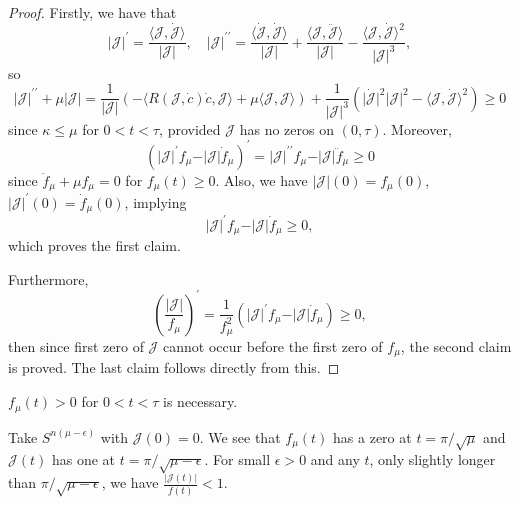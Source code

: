 \begin{proof}
	Firstly, we have that
	\[
		\vert \mathcal{J}  \vert ^{\prime} = \frac{\langle \mathcal{J} , \dot{\mathcal{J} }  \rangle }{\vert \mathcal{J}  \vert },\quad
		\vert \mathcal{J}  \vert ^{\prime\prime} = \frac{\langle \dot{\mathcal{J} } , \dot{\mathcal{J} } \rangle }{\vert \mathcal{J}  \vert } + \frac{\langle \mathcal{J} , \ddot{\mathcal{J} }  \rangle }{\vert \mathcal{J}  \vert } - \frac{\langle \mathcal{J} , \dot{\mathcal{J} }  \rangle ^2}{\vert \mathcal{J} \vert^3 },
	\]
	so
	\[
		\vert \mathcal{J}  \vert ^{\prime\prime} + \mu \vert \mathcal{J} \vert
		= \frac{1}{\vert \mathcal{J} \vert } \left( - \langle R(\mathcal{J} , \dot{c} ) \dot{c}, \mathcal{J} \rangle + \mu \langle \mathcal{J} , \mathcal{J}  \rangle  \right) + \frac{1}{\vert \mathcal{J}  \vert ^3} \left( \vert \dot{\mathcal{J} } \vert^2 \vert \mathcal{J}  \vert ^2 - \langle \mathcal{J} , \dot{\mathcal{J} } \rangle ^2 \right) \geq 0
	\]
	since \(\kappa \leq \mu \) for \(0 < t < \tau \), provided \(\mathcal{J} \) has no zeros on \((0, \tau )\). Moreover,
	\[
		\left( \vert \mathcal{J}  \vert ^{\prime} f_\mu - \vert \mathcal{J}  \vert \dot{f} _\mu  \right) ^{\prime}
		= \vert \mathcal{J}  \vert ^{\prime\prime} f_\mu - \vert \mathcal{J}  \vert \ddot{f}_\mu \geq 0
	\]
	since \(\ddot{f}_\mu + \mu f_\mu = 0\) for \(f_\mu (t) \geq 0\). Also, we have \(\vert \mathcal{J}  \vert (0) = f_\mu (0)\), \(\vert \mathcal{J}  \vert ^{\prime} (0) = \dot{f} _\mu (0)\), implying
	\[
		\vert \mathcal{J}  \vert ^{\prime} f_\mu - \vert \mathcal{J}  \vert \dot{f} _\mu \geq 0,
	\]
	which proves the first claim.

	Furthermore,
	\[
		\left( \frac{\vert \mathcal{J}  \vert }{f_\mu } \right) ^{\prime} = \frac{1}{f^2_\mu } \left( \vert \mathcal{J}  \vert ^{\prime} f_\mu - \vert \mathcal{J}  \vert \dot{f} _\mu  \right) \geq 0,
	\]
	then since first zero of \(\mathcal{J}\) cannot occur before the first zero of \(f_\mu \), the second claim is proved. The last claim follows directly from this.
\end{proof}

\begin{remark}
	\(f_\mu (t) > 0\) for \(0 < t < \tau \) is necessary.
\end{remark}
\begin{explanation}
	Take \(S^{n(\mu - \epsilon )} \) with \(\mathcal{J} (0) = 0\). We see that \(f_\mu (t)\) has a zero at \(t = \pi / \sqrt{\mu } \) and \(\mathcal{J} (t)\) has one at \(t = \pi / \sqrt{\mu - \epsilon } \). For small \(\epsilon > 0\) and any \(t\), only slightly longer than \(\pi / \sqrt{\mu - \epsilon } \), we have \(\frac{\vert \mathcal{J} (t) \vert }{f(t)} < 1\).
\end{explanation}

